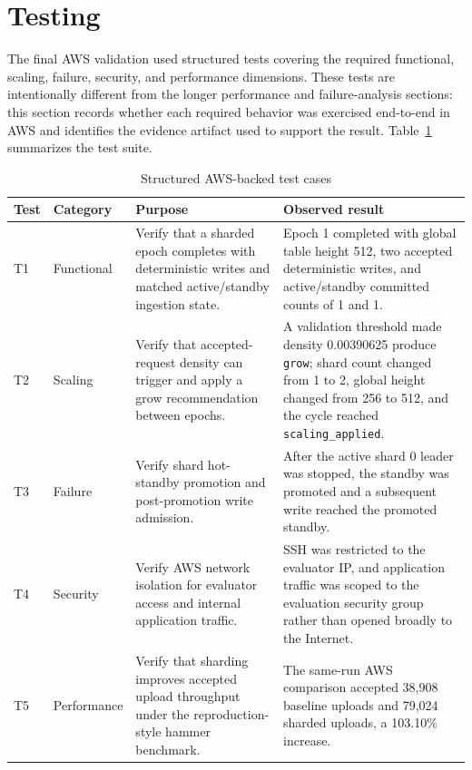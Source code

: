 \documentclass[conference]{IEEEtran}
\begin{document}
\section{Testing}

The final AWS validation used structured tests covering the required functional, scaling, failure, security, and performance dimensions. These tests are intentionally different from the longer performance and failure-analysis sections: this section records whether each required behavior was exercised end-to-end in AWS and identifies the evidence artifact used to support the result. Table~\ref{tab:structured-tests} summarizes the test suite.

\begin{table}[!t]
\centering
\caption{Structured AWS-backed test cases}
\label{tab:structured-tests}
\small
\begin{tabular}{p{} p{} p{} p{}}
\hline
\textbf{Test} & \textbf{Category} & \textbf{Purpose} & \textbf{Observed result} \\
\hline
T1 & Functional & Verify that a sharded epoch completes with deterministic writes and matched active/standby ingestion state. & Epoch 1 completed with global table height 512, two accepted deterministic writes, and active/standby committed counts of 1 and 1. \\
T2 & Scaling & Verify that accepted-request density can trigger and apply a grow recommendation between epochs. & A validation threshold made density 0.00390625 produce \texttt{grow}; shard count changed from 1 to 2, global height changed from 256 to 512, and the cycle reached \texttt{scaling\_applied}. \\
T3 & Failure & Verify shard hot-standby promotion and post-promotion write admission. & After the active shard 0 leader was stopped, the standby was promoted and a subsequent write reached the promoted standby. \\
T4 & Security & Verify AWS network isolation for evaluator access and internal application traffic. & SSH was restricted to the evaluator IP, and application traffic was scoped to the evaluation security group rather than opened broadly to the Internet. \\
T5 & Performance & Verify that sharding improves accepted upload throughput under the reproduction-style hammer benchmark. & The same-run AWS comparison accepted 38,908 baseline uploads and 79,024 sharded uploads, a 103.10\% increase. \\
\hline
\end{tabular}
\end{table}
\end{document}
